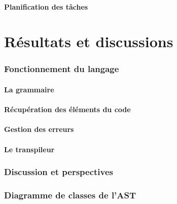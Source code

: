 \documentclass[a4paper]{article}%
\begin{document}
\subsection{Planification des tâches}


\clearpage
\part{Résultats et discussions}

\section{Fonctionnement du langage}

\subsection{La grammaire}

\subsection{Récupération des éléments du code}

\subsection{Gestion des erreurs}

\subsection{Le transpileur}

\section{Discussion et perspectives}

\clearpage{}
\printbibliography[keyword={paper},title={Biliographie}]
\printbibliography[keyword={web},title={Webographie}]

\clearpage
\printglossaries

\appendix

\clearpage{}
\section{Diagramme de classes de l'AST}\label{appendix:classAST}

\begin{figure}[h]
  \begin{center}
  \end{center}
\end{figure}
\end{document}
